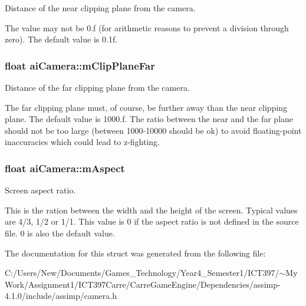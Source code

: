Distance of the near clipping plane from the camera.

The value may not be 0.f (for arithmetic reasons to prevent a division through zero). The default value is 0.1f. \hypertarget{structai_camera_a9ccf77e3d7ca3dc8f46df931b65172f}{
\subsubsection[mClipPlaneFar]{\setlength{\rightskip}{0pt plus 5cm}float {\bf aiCamera::mClipPlaneFar}}}
\label{structai_camera_a9ccf77e3d7ca3dc8f46df931b65172f}


Distance of the far clipping plane from the camera.

The far clipping plane must, of course, be further away than the near clipping plane. The default value is 1000.f. The ratio between the near and the far plane should not be too large (between 1000-10000 should be ok) to avoid floating-point inaccuracies which could lead to z-fighting. \hypertarget{structai_camera_e414556eaa6f910b5927f465d97bf70c}{
\subsubsection[mAspect]{\setlength{\rightskip}{0pt plus 5cm}float {\bf aiCamera::mAspect}}}
\label{structai_camera_e414556eaa6f910b5927f465d97bf70c}


Screen aspect ratio.

This is the ration between the width and the height of the screen. Typical values are 4/3, 1/2 or 1/1. This value is 0 if the aspect ratio is not defined in the source file. 0 is also the default value. 

The documentation for this struct was generated from the following file:\begin{CompactItemize}
\item 
C:/Users/New/Documents/Games\_\-Technology/Year4\_\-Semester1/ICT397/$\sim$My Work/Assignment1/ICT397Carre/CarreGameEngine/Dependencies/assimp-4.1.0/include/assimp/camera.h\end{CompactItemize}
